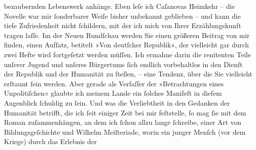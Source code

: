 \begin{ledgroupsized}[t]{13cm}
               bezaubernden Lebenswerk anhänge. Eben leſe ich Caſanovas
                  Heimkehr – die Novelle war mir ſonderbarer Weiſe bisher unbekannt geblieben –
               und kann die tiefe Zufriedenheit nicht ſchildern, mit der ich {\pb}mich von Ihrer Erzählungskunſt tragen
               laſſe.\pend
           \pstart
           Im \label{K_L02392_1v}\label{K_L02392_1h} der Neuen Rundſchau werden
               Sie einen größeren Beitrag von mir finden, einen Aufſatz, betitelt »Von deutſcher Republik«, der vielleicht gar durch zwei Hefte wird
               fortgeſetzt werden müſſen. Ich ermahne darin die renitenten Teile unſerer Jugend und
               unſeres Bürgertums ſich endlich vorbehaltlos in den Dienſt der Republik und der
               Humanität zu ſtellen, – eine Tendenz, über die Sie vielleicht erſtaunt ſein werden.
               Aber gerade als Verfaſſer der »Betrachtungen eines
                  Unpolitiſchen« glaubte ich meinem Lande ein ſolches Manifeſt in dieſem
               Augenblick ſchuldig zu ſein. Und was die Verliebtheit in den Gedanken der Humanität
               betrifft, die ich ſeit einiger Zeit bei mir feſtstelle, ſo mag ſie mit dem Roman zuſammenhängen, an dem ich
               ſchon {\pb}allzu lange ſchreibe, einer Art von
               Bildungsgeſchichte und Wilhelm
                  Meiſteriade, worin ein junger Menſch (vor dem Kriege) durch das Erlebnis der

\end{ledgroupsized}
